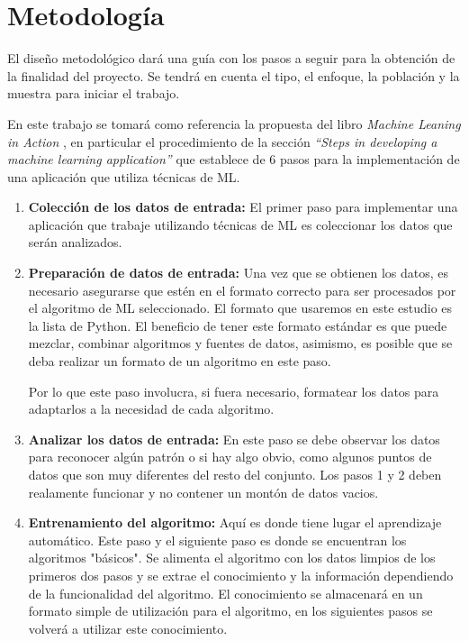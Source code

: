 \section{Metodología}
El diseño metodológico dará una guía con los pasos a seguir para la obtención de la finalidad del proyecto. Se tendrá en cuenta el tipo, el enfoque, la población y la muestra para iniciar el trabajo.\\
\par En este trabajo se tomará como referencia la propuesta del libro \emph{Machine Leaning in Action} \cite{Harrington2012}, en particular el procedimiento de la sección \emph{“Steps in developing a machine learning application”} que establece de 6 pasos para la implementación de una aplicación que utiliza técnicas de ML. \\
\begin{enumerate}
	\item \textbf{Colección de los datos de entrada:} El primer paso para implementar una aplicación que trabaje utilizando técnicas de ML es coleccionar los datos que serán analizados. 
	\item \textbf{Preparación de datos de entrada:} Una vez que se obtienen los datos, es necesario asegurarse que estén en el formato correcto para ser procesados por el algoritmo de ML seleccionado. El formato que usaremos en este estudio es la lista de Python. El beneficio de tener este formato estándar es que puede mezclar, combinar algoritmos y fuentes de datos, asimismo, es posible que se deba realizar un formato de un algoritmo en este paso.
\par Por lo que este paso involucra, si fuera necesario, formatear los datos para adaptarlos a la necesidad de cada algoritmo.

	\item \textbf{Analizar los datos de entrada:} En este paso se debe observar los datos para reconocer algún patrón 	o si hay algo obvio, como algunos puntos de datos que son muy diferentes del resto del conjunto. Los pasos 1 y 2 deben realamente funcionar y no contener un montón de datos vacios. 

	\item \textbf{Entrenamiento del algoritmo:} Aquí es donde tiene lugar el aprendizaje automático. Este paso y el siguiente paso es donde se encuentran los algoritmos "básicos". Se alimenta el algoritmo con los datos limpios de los primeros dos pasos y se extrae el conocimiento y la información dependiendo de la funcionalidad del algoritmo. El conocimiento se almacenará en un formato simple de utilización para el algoritmo, en los siguientes pasos se volverá a utilizar este conocimiento.


\end{enumerate}
